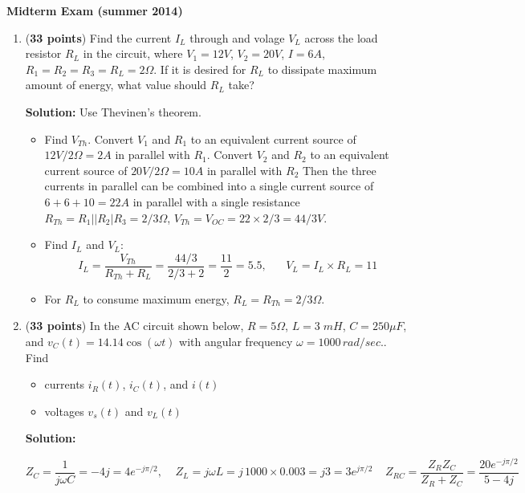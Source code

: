 \usepackage{html}

\begin{center}
{\Large \bf  Midterm Exam (summer 2014)}
\end{center}

\begin{enumerate}

\item ({\bf 33 points}) 
  Find the current $I_L$ through and volage $V_L$ across the load resistor
  $R_L$ in the circuit, where $V_1=12V$, $V_2=20V$, $I=6A$, 
  $R_1=R_2=R_3=R_L=2\Omega$. If it is desired for $R_L$ to dissipate maximum 
  amount of energy, what value should $R_L$ take?


  {\bf Solution:} Use Thevinen's theorem. 
  \begin{itemize}
  \item Find $V_{Th}$. Convert $V_1$ and $R_1$ to an equivalent current source
    of $12V/2\Omega=2A$ in parallel with $R_1$. Convert $V_2$ and $R_2$ to
    an equivalent current source of $20V/2\Omega=10A$ in parallel with $R_2$
    Then the three currents in parallel can be combined into a single current
    source of $6+6+10=22A$ in parallel with a single resistance 
    $R_{Th}=R_1||R_2|R_3=2/3\Omega$, $V_{Th}=V_{OC}=22\times 2/3=44/3V$.
  \item Find $I_L$ and $V_L$:
    \[
    I_L=\frac{V_{Th}}{R_{Th}+R_L}=\frac{44/3}{2/3+2}=\frac{11}{2}=5.5,
    \;\;\;\;\;\;
    V_L=I_L\times R_L=11
    \]    
  \item For $R_L$ to consume maximum energy, $R_L=R_{Th}=2/3\Omega$.
  \end{itemize}

\item ({\bf 33 points}) 
  In the AC circuit shown below, $R=5\Omega$, $L=3\;mH$, $C=250\mu F$, and 
  $v_C(t)=14.14\cos(\omega t)$ with angular frequency $\omega=1000\,rad/sec.$.
  Find 
  \begin{itemize}
  \item currents $i_R(t)$, $i_C(t)$, and $i(t)$
  \item voltages $v_s(t)$ and $v_L(t)$
  \end{itemize}
  


  {\bf Solution:} 

  \[
  Z_C=\frac{1}{j\omega C}=-4j=4e^{-j\pi/2},\;\;\;\;
  Z_L=j\omega L=j\,1000\times 0.003=j3=3e^{j\pi/2}\;\;\;\;
  Z_{RC}=\frac{Z_RZ_C}{Z_R+Z_C}=\frac{20 e^{-j\pi/2}}{5-4j}
  \]
  


\end{enumerate}
